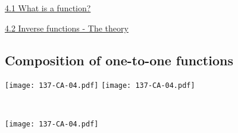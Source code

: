 \documentclass[11pt]{article}
\newcommand{\vi}{\hspace{8mm} \href{https://www.youtube.com/watch?v=17lUN_X8vAY&list=PLlwePzQY_wW-EDeUZebRoA8HGoeZxxpEU&index=1}{4.1 What is a function?}}
\newcommand{\vii}{\hspace{8mm} \href{https://www.youtube.com/watch?v=DxecWsEms_c&list=PLlwePzQY_wW-EDeUZebRoA8HGoeZxxpEU&index=2}{4.2 Inverse functions - The theory}}
\begin{document}
\begin{videos}
\vi

\vii
\end{videos}

\newpage

\subsection{Composition of one-to-one functions} 

\begin{center}
{ \texttt{[image: 137-CA-04.pdf]}} \quad
{ \texttt{[image: 137-CA-04.pdf]}} 

\

{ \texttt{[image: 137-CA-04.pdf]}} 
\end{center}
\end{document}
